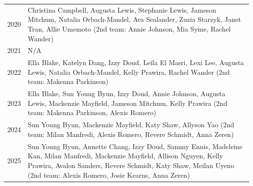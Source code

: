 \begin{table}[H]
{\begin{tabular}{c p{}}
2020 & Christina Campbell, Augusta Lewis, Stephanie Lewis, Jameson Mitchum, Natalia Orbach-Mandel, Ava Sealander, Zuzia Starzyk, Janet Tran, Allie Umemoto (2nd team: Annie Johnson, Mia Syme, Rachel Wander) \\
2021 & N/A \\
2022 & Ella Blake, Katelyn Dang, Izzy Doud, Leila El Masri, Lexi Lee, Augusta Lewis, Natalia Orbach-Mandel, Kelly Prawira, Rachel Wander (2nd team: Makenna Parkinson) \\
2023 & Ella Blake, Sun Young Byun, Izzy Doud, Annie Johnson, Augusta Lewis, Mackenzie Mayfield, Jameson Mitchum, Kelly Prawira (2nd team: Makenna Parkinson, Alexis Romero) \\
2024 & Sun Young Byun, Mackenzie Mayfield, Katy Shaw, Allyson Yao (2nd team: Milan Manfredi, Alexis Romero, Revere Schmidt, Anna Zeren) \\
2025 & Sun Young Byun, Annette Chang, Izzy Doud, Sammy Ennis, Madeleine Kan, Milan Manfredi, Mackenzie Mayfield, Allison Nguyen, Kelly Prawira, Avalon Sanders, Revere Schmidt, Katy Shaw, Meilan Uyeno (2nd team: Alexis Romero, Josie Kearns, Anna Zeren) \\
\bottomrule
\end{tabular}%
}
\end{table}
    

    
